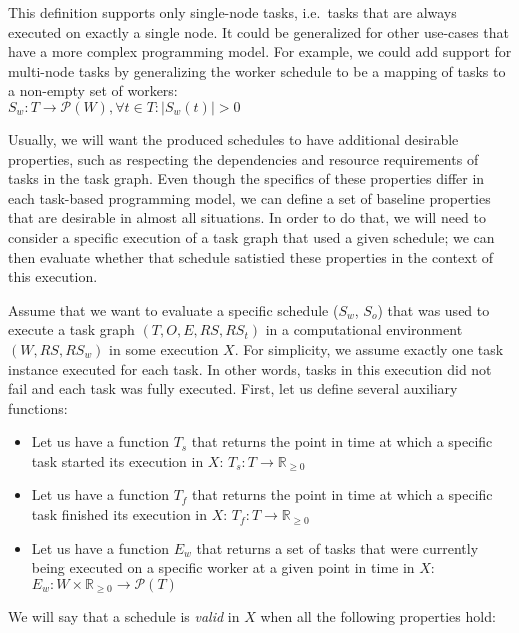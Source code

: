 This definition supports only single-node tasks, i.e.\ tasks that are always executed on exactly
a single node. It could be generalized for other use-cases that have a more complex programming
model. For example, we could add support for multi-node tasks by generalizing the worker schedule
to be a mapping of tasks to a non-empty set of workers: \\
$S_w\colon T \rightarrow \mathcal{P}(W), \forall t\in{}T\colon |S_w(t)| > 0$

Usually, we will want the produced schedules to have additional desirable properties, such as
respecting the dependencies and resource requirements of tasks in the task graph. Even though the
specifics of these properties differ in each task-based programming model, we can define a set of
baseline properties that are desirable in almost all situations. In order to do that, we will need
to consider a specific execution of a task graph that used a given schedule; we can then evaluate
whether that schedule satistied these properties in the context of this execution.

Assume that we want to evaluate a specific schedule ($S_w$, $S_o$) that was used to execute a
task graph $(T, O, E, RS, RS_t)$ in a computational environment $(W, RS, RS_w)$ in some execution $X$. For
simplicity, we assume exactly one task instance executed for each task. In other words,
tasks in this execution did not fail and each task was fully executed.
First, let us define several auxiliary functions:

\newcommand{\timedomain}{\mathbb{R}_{\geq{}0}}

\begin{itemize}
	\item Let us have a function $T_s$ that returns the point in time at which a specific
	      task started its execution in $X$: $T_s\colon T \rightarrow \timedomain$
	\item Let us have a function $T_f$ that returns the point in time at which a specific
	      task finished its execution in $X$: $T_f\colon T \rightarrow \timedomain$
	\item Let us have a function $E_w$ that returns a set of tasks that were currently being
	      executed on a specific worker at a given point in time in $X$:
	      $E_w\colon W \times \timedomain \rightarrow \mathcal{P}(T)$
\end{itemize}

We will say that a schedule is \emph{valid} in $X$ when all the following properties hold:

